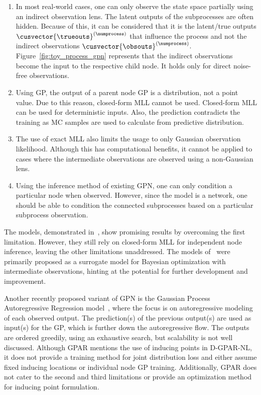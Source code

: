 \begin{enumerate}
      \item In most real-world cases, one can only observe the state space partially using an indirect observation lens. The latent outputs of the subprocesses are often hidden. Because of this, it can be considered that it is the latent/true outputs $\cusvector{\trueouts}^{(\numprocess)}$ that influence the process and not the indirect observations $\cusvector{\obsouts}^{(\numprocess)}$. Figure~\ref{fig:toy_process_gpn} represents that the indirect observations become the input to the respective child node. It holds only for direct noise-free observations.
      \item Using GP, the output of a parent node GP is a distribution, not a point value. Due to this reason, closed-form MLL cannot be used. Closed-form MLL can be used for deterministic inputs. Also, the prediction contradicts the training as MC samples are used to calculate from predictive distribution.
      \item The use of exact MLL also limits the usage to only Gaussian observation likelihood. Although this has computational benefits, it cannot be applied to cases where the intermediate observations are observed using a non-Gaussian lens.
      \item Using the inference method of existing GPN, one can only condition a particular node when observed. However, since the model is a network, one should be able to condition the connected subprocesses based on a particular subprocess observation.
\end{enumerate}

The models, demonstrated in~\cite{sussex2022model, kusakawa2022bayesian}, show promising results by overcoming the first limitation. However, they still rely on closed-form MLL for independent node inference, leaving the other limitations unaddressed. The models of~\cite{aglietti2020causal, sussex2022model, astudillo2021bayesian} were primarily proposed as a surrogate model for Bayesian optimization with intermediate observations, hinting at the potential for further development and improvement.

Another recently proposed variant of GPN is the Gaussian Process Autoregressive Regression model~\citep{requeima2019gaussian}, where the focus is on autoregressive modeling of each observed output. The prediction(s) of the previous output(s) are used as input(s) for the GP, which is further down the autoregressive flow. The outputs are ordered greedily, using an exhaustive search, but scalability is not well discussed. Although GPAR mentions the use of inducing points in D-GPAR-NL, it does not provide a training method for joint distribution loss and either assume fixed inducing locations or individual node GP training. Additionally, GPAR does not cater to the second and third limitations or provide an optimization method for inducing point formulation.